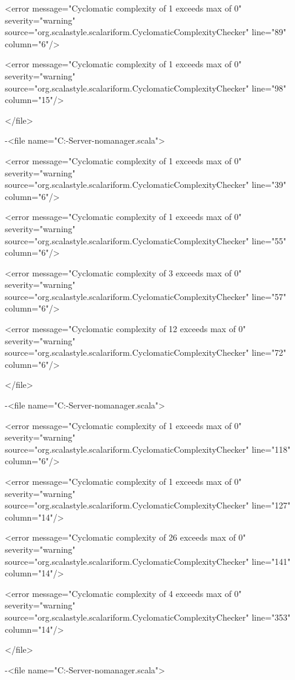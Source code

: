 \documentclass{scalatekids-article}
\begin{document}
<error message="Cyclomatic complexity of 1 exceeds max of 0" severity="warning" source="org.scalastyle.scalariform.CyclomaticComplexityChecker" line="89" column="6"/>

<error message="Cyclomatic complexity of 1 exceeds max of 0" severity="warning" source="org.scalastyle.scalariform.CyclomaticComplexityChecker" line="98" column="15"/>

</file>


-<file name="C:\Users\Davide\Desktop\Actorbase-Server-nomanager\src\main\scala\com\actorbase\actorsystem\ninja\Ninja.scala">

<error message="Cyclomatic complexity of 1 exceeds max of 0" severity="warning" source="org.scalastyle.scalariform.CyclomaticComplexityChecker" line="39" column="6"/>

<error message="Cyclomatic complexity of 1 exceeds max of 0" severity="warning" source="org.scalastyle.scalariform.CyclomaticComplexityChecker" line="55" column="6"/>

<error message="Cyclomatic complexity of 3 exceeds max of 0" severity="warning" source="org.scalastyle.scalariform.CyclomaticComplexityChecker" line="57" column="6"/>

<error message="Cyclomatic complexity of 12 exceeds max of 0" severity="warning" source="org.scalastyle.scalariform.CyclomaticComplexityChecker" line="72" column="6"/>

</file>


-<file name="C:\Users\Davide\Desktop\Actorbase-Server-nomanager\src\main\scala\com\actorbase\actorsystem\main\Main.scala">

<error message="Cyclomatic complexity of 1 exceeds max of 0" severity="warning" source="org.scalastyle.scalariform.CyclomaticComplexityChecker" line="118" column="6"/>

<error message="Cyclomatic complexity of 1 exceeds max of 0" severity="warning" source="org.scalastyle.scalariform.CyclomaticComplexityChecker" line="127" column="14"/>

<error message="Cyclomatic complexity of 26 exceeds max of 0" severity="warning" source="org.scalastyle.scalariform.CyclomaticComplexityChecker" line="141" column="14"/>

<error message="Cyclomatic complexity of 4 exceeds max of 0" severity="warning" source="org.scalastyle.scalariform.CyclomaticComplexityChecker" line="353" column="14"/>

</file>


-<file name="C:\Users\Davide\Desktop\Actorbase-Server-nomanager\src\main\scala\com\actorbase\actorsystem\utils\CollectionRange.scala">
\end{document}
